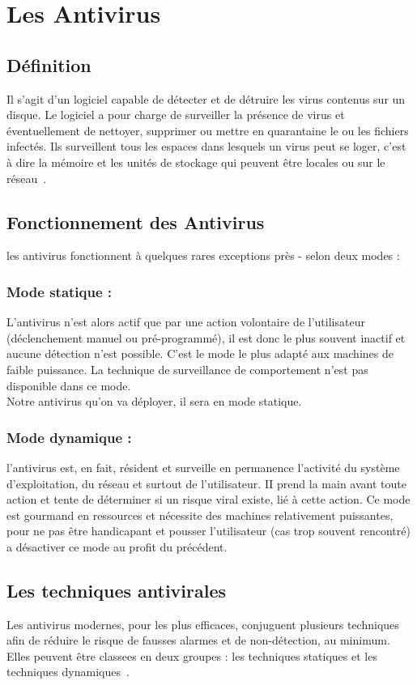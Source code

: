 \section{Les Antivirus}

\subsection{Définition}
Il s'agit d'un logiciel capable de détecter et de détruire les virus contenus sur un disque. Le logiciel a pour charge de surveiller la présence de virus et éventuellement de nettoyer, supprimer ou mettre en quarantaine le ou les fichiers infectés. Ils surveillent tous les espaces dans lesquels un virus peut se loger, c'est à dire la mémoire et les unités de stockage qui peuvent être locales ou sur le réseau~\cite{anti}.
\subsection{Fonctionnement des Antivirus}
les antivirus fonctionnent à quelques rares exceptions près - selon deux modes : ~\cite{anti}
\subsubsection{Mode statique :} 
L'antivirus n'est alors actif que par une action volontaire
de l'utilisateur (déclenchement manuel ou pré-programmé), il est donc le plus souvent inactif et aucune détection n'est possible. C'est le mode le plus adapté aux machines de faible puissance. La technique de surveillance de comportement n'est pas disponible dans ce mode.\\
Notre antivirus qu'on va déployer, il sera en mode statique.
\subsubsection{Mode dynamique :}
l'antivirus est, en fait, résident et surveille en permanence l'activité du système d'exploitation, du réseau et surtout de l'utilisateur. II prend la main avant toute action et tente de déterminer si un risque viral existe, lié à cette action. Ce mode est gourmand en ressources et nécessite des machines relativement puissantes, pour ne pas être handicapant et pousser l'utilisateur (cas trop souvent rencontré) a désactiver ce mode au profit du précédent.
\subsection{Les techniques antivirales}
Les antivirus modernes, pour les plus efficaces, conjuguent plusieurs techniques afin de réduire le risque de fausses alarmes et de non-détection, au minimum. Elles peuvent être classees en deux groupes : les techniques statiques et les techniques dynamiques~\cite{anti}.
